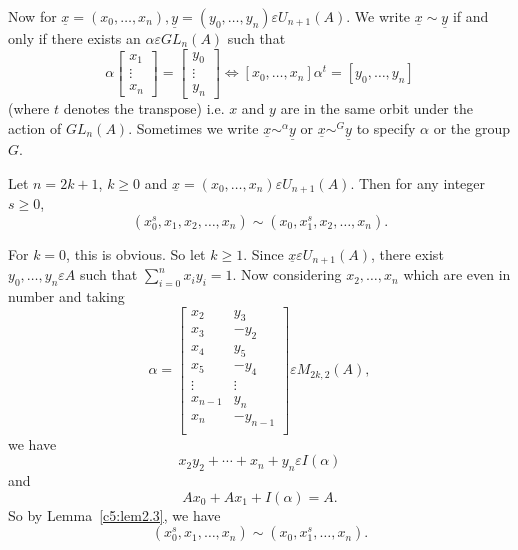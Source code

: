 \begin{Proof}
Now for
$\underline{x}=(x_0,\ldots,x_n),\underline{y}=(y_0,\ldots,y_n)\varepsilon
U_{n+1}(A)$. We write $\underline{x}\sim \underline{y}$ if and only if
there exists an $\alpha \varepsilon GL_n(A)$ such that 
$$
\alpha
\begin{bmatrix}
x_1\\
\vdots\\
x_n
\end{bmatrix} = \begin{bmatrix}
y_0\\
\vdots\\
y_n
\end{bmatrix} \Leftrightarrow [x_0,\ldots,x_n]\alpha^{t}=[y_0,\ldots,y_n]
$$
(where $t$ denotes the transpose) i.e. $x$ and $y$ are in the same
orbit under the action of $GL_n(A)$. Sometimes we write
$\underline{x}\displaystyle\mathop{\sim}^{\alpha}\underline{y}$ or
$\underline{x}\displaystyle\mathop{\sim}^{G}\underline{y}$ to specify
$\alpha$ or the group $G$. 
\enprf
\end{Proof}

\begin{coro}\label{c5:coro2.4}
Let $n=2k+1$, $k\geq 0$ and $\underline{x}=(x_0,\ldots,
x_n)\varepsilon U_{n+1}(A)$. Then for any integer $s\geq 0$, 
$$
\left(x^{s}_0,x_1,x_2,\ldots,x_n\right)\sim \left(x_0,x_1^{s},x_2,\ldots,x_n\right).
$$
\end{coro}

\begin{Proof}
For $k=0$, this is obvious. So let $k\geq 1$. Since
$\underline{x}\varepsilon U_{n+1}(A)$, there exist $y_0,\ldots,y_n
\varepsilon A$ such that $\sum\limits_{i=0}^{n} x_iy_i=1$. Now
considering $x_2,\ldots, x_n$ which are even in number and taking 
$$
\alpha=
\begin{bmatrix}
x_2 & y_3\\
x_3 & -y_2\\
x_4 & y_5\\
x_5 & -y_4\\
\vdots & \vdots\\
x_{n-1} &  y_n\\
x_n & -y_{n-1}\\
\end{bmatrix} \varepsilon M_{2k, 2}(A), 
$$
we have 
$$
x_2y_2+\cdots+x_n+y_n\varepsilon I(\alpha)
$$
and
$$
Ax_0+Ax_1+I(\alpha)=A.
$$
So by Lemma~\ref{c5:lem2.3}, we have 
$$
\left(x^{s}_0,x_1,\ldots, x_n\right)\sim\left(x_0,x^{s}_1,\ldots, x_n\right).
$$
\enprf
\end{Proof}


